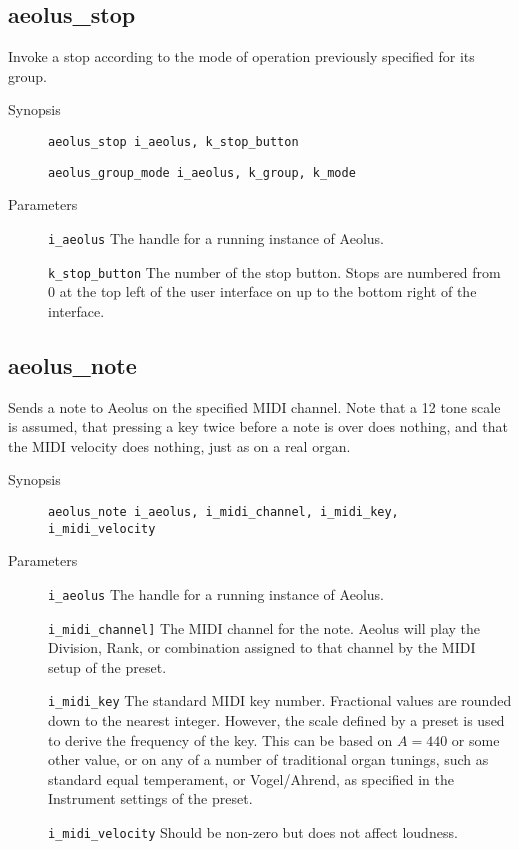 \documentclass[english,11pt,letterpaper,onecolumn]{scrartcl}
\begin{document}
{\subsection*{aeolus\_stop}

Invoke a stop according to the mode of operation previously specified for its group.

\begin{description}
	\item[Synopsis]
	\item[]\lstinline|aeolus_stop i_aeolus, k_stop_button|
	\item[]\lstinline|aeolus_group_mode i_aeolus, k_group, k_mode|
	\item[Parameters]
	\item[]\lstinline|i_aeolus| The handle for a running instance of Aeolus.
	\item[]\lstinline|k_stop_button| The number of the stop button. Stops are numbered from 0 at the top left of the user interface on up to the bottom right of the interface.
\end{description}

\subsection*{aeolus\_note}

Sends a note to Aeolus on the specified MIDI channel. Note that a 12 tone scale is assumed, that pressing a key twice before a note is over does nothing, and that the MIDI velocity does nothing, just as on a real organ. 

\begin{description}
	\item[Synopsis]
	\item[]\lstinline|aeolus_note i_aeolus, i_midi_channel, i_midi_key, i_midi_velocity|
	\item[Parameters]
	\item[]\lstinline|i_aeolus| The handle for a running instance of Aeolus.
	\item[]\lstinline|i_midi_channel]| The MIDI channel for the note. Aeolus will play the Division, Rank, or combination assigned to that channel by the MIDI setup of the preset.
	\item[]\lstinline|i_midi_key| The standard MIDI key number. Fractional values are rounded down to the nearest integer. However, the scale defined by a preset is used to derive the frequency of the key. This can be based on $A = 440$ or some other value, or on any of a number of traditional organ tunings, such as standard equal temperament, or Vogel/Ahrend, as specified in the Instrument settings of the preset.
	\item[]\lstinline|i_midi_velocity| Should be non-zero but does not affect loudness.
\end{description}

}
\end{document}
